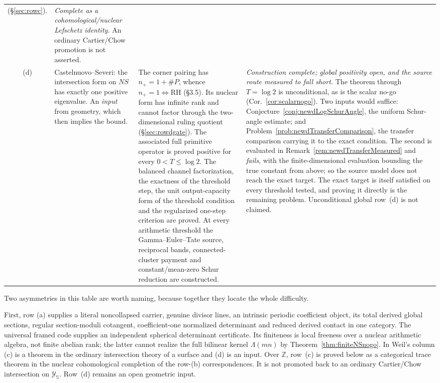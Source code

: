 \documentclass[11pt]{amsart}
\theoremstyle{definition}
\theoremstyle{remark}
\newcommand{\Z}{\mathbb Z}
\newcommand{\RH}{\mathrm{RH}}
\begin{document}
\begin{tabularx}{\textwidth}{@{}c p{} p{} Y@{}}
(\S\ref{sec:rowc}). &
\emph{Complete as a cohomological/nuclear Lefschetz identity.}  An ordinary
Cartier/Chow promotion is not asserted. \\
\addlinespace
(d) &
Castelnuovo--Severi: the intersection form on $NS$ has exactly one positive
eigenvalue.  An \emph{input} from geometry, which then implies the bound. &
The corner pairing has $n_+=1+\#P$, whence $n_+=1\iff\RH$ (\S3.5).
Its nuclear form has infinite rank and cannot factor through the
two-dimensional ruling quotient
(\S\ref{sec:rowdgate}).  The associated full primitive operator is proved
positive for every $0<T\le\log2$.  The balanced channel factorization, the
exactness of the threshold step, the unit output-capacity form of the
threshold condition and the regularized one-step criterion are proved.  At
every arithmetic threshold the Gamma--Euler--Tate source, reciprocal bands,
connected-cluster payment and constant/mean-zero Schur reduction are
constructed. &
\emph{Construction complete; global positivity open, and the source route
measured to fall short.}  The theorem through $T=\log2$ is unconditional, as
is the scalar no-go (Cor.~\ref{cor:scalarnogo}).  Two inputs would suffice:
Conjecture~\ref{conj:newdLogSchurAngle}, the uniform Schur-angle estimate;
and Problem~\ref{prob:newdTransferComparison}, the transfer comparison
carrying it to the exact condition.  The second is evaluated in
Remark~\ref{rem:newdTransferMeasured} and \emph{fails}, with the
finite-dimensional evaluation bounding the true constant from above; so the
source model does not reach the exact target.  The exact target is itself
satisfied on every threshold tested, and proving it directly is the remaining
problem.  Unconditional global row~(d) is not claimed.
 \\
\bottomrule
\end{tabularx}
\endgroup

\medskip

Two asymmetries in this table are worth naming, because together they
locate the whole difficulty.

First, row (a) supplies a literal noncollapsed carrier, genuine divisor
lines, an intrinsic periodic coefficient object, its total derived global
sections, regular section-moduli cotangent, coefficient-one normalized
determinant and reduced derived contact in one category.  The universal
framed code supplies an independent spherical determinant certificate.
Its finiteness is local
freeness over a nuclear arithmetic algebra, not finite abelian rank; the
latter cannot realize the full bilinear kernel $\Lambda(mn)$ by
Theorem~\ref{thm:finiteNSnogo}.  In Weil's column (c) is a theorem in the
ordinary intersection theory of a surface and (d) is an input.  Over $\Z$,
row~(c) is proved below as a categorical trace theorem in the nuclear
cohomological completion of the row-(b) correspondences.  It is not promoted
back to an ordinary Cartier/Chow intersection on $\mathscr Y_{\mathbb S}$.  Row~(d)
remains an open geometric input.
\end{document}
